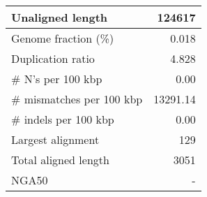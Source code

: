 \documentclass[12pt,a4paper]{article}
\begin{document}
\begin{table}[ht]
\begin{center}
\begin{tabular}{|l*{1}{|r}|}
Unaligned length & 124617 \\ \hline
Genome fraction (\%) & 0.018 \\ \hline
Duplication ratio & 4.828 \\ \hline
\# N's per 100 kbp & 0.00 \\ \hline
\# mismatches per 100 kbp & 13291.14 \\ \hline
\# indels per 100 kbp & 0.00 \\ \hline
Largest alignment & 129 \\ \hline
Total aligned length & 3051 \\ \hline
NGA50 & - \\ \hline
\end{tabular}
\end{center}
\end{table}
\end{document}
